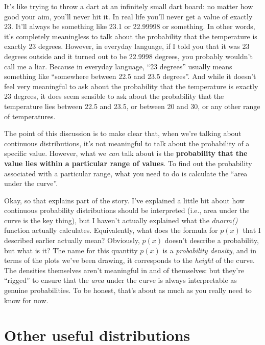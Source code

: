 \documentclass[]{book}
\begin{document}
It's like trying to throw a dart at an infinitely small dart board: no matter how good your aim, you'll never hit it. In real life you'll never get a value of exactly 23. It'll always be something like 23.1 or 22.99998 or something. In other words, it's completely meaningless to talk about the probability that the temperature is exactly 23 degrees. However, in everyday language, if I told you that it was 23 degrees outside and it turned out to be 22.9998 degrees, you probably wouldn't call me a liar. Because in everyday language, ``23 degrees'' usually means something like ``somewhere between 22.5 and 23.5 degrees''. And while it doesn't feel very meaningful to ask about the probability that the temperature is exactly 23 degrees, it does seem sensible to ask about the probability that the temperature lies between 22.5 and 23.5, or between 20 and 30, or any other range of temperatures.

The point of this discussion is to make clear that, when we're talking about continuous distributions, it's not meaningful to talk about the probability of a specific value. However, what we \emph{can} talk about is the \textbf{probability that the value lies within a particular range of values}. To find out the probability associated with a particular range, what you need to do is calculate the ``area under the curve''.

Okay, so that explains part of the story. I've explained a little bit about how continuous probability distributions should be interpreted (i.e., area under the curve is the key thing), but I haven't actually explained what the \emph{dnorm()} function actually calculates. Equivalently, what does the formula for \(p(x)\) that I described earlier actually mean? Obviously, \(p(x)\) doesn't describe a probability, but what is it? The name for this quantity \(p(x)\) is a \emph{probability density}, and in terms of the plots we've been drawing, it corresponds to the \emph{height} of the curve. The densities themselves aren't meaningful in and of themselves: but they're ``rigged'' to ensure that the \emph{area} under the curve is always interpretable as genuine probabilities. To be honest, that's about as much as you really need to know for now.

\hypertarget{other-useful-distributions}{%
\section{Other useful distributions}\label{other-useful-distributions}}
\end{document}
